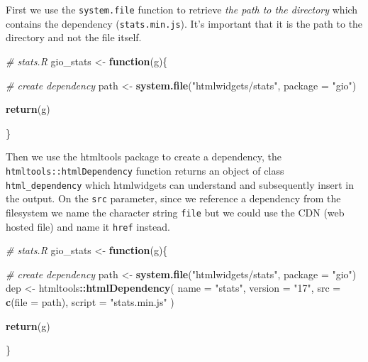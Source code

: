 \documentclass[
]{krantz}
\makeatletter
\newenvironment{Shaded}{\begin{snugshade}}{\end{snugshade}}
\newcommand{\CommentTok}[1]{\textcolor[rgb]{0.37,0.37,0.37}{\textit{#1}}}
\newcommand{\ControlFlowTok}[1]{\textcolor[rgb]{0.27,0.27,0.27}{\textbf{#1}}}
\newcommand{\DataTypeTok}[1]{\textcolor[rgb]{0.27,0.27,0.27}{#1}}
\newcommand{\KeywordTok}[1]{\textcolor[rgb]{0.27,0.27,0.27}{\textbf{#1}}}
\newcommand{\NormalTok}[1]{#1}
\newcommand{\OperatorTok}[1]{\textcolor[rgb]{0.43,0.43,0.43}{\textbf{#1}}}
\newcommand{\StringTok}[1]{\textcolor[rgb]{0.5,0.5,0.5}{#1}}
\newenvironment{kframe}{%
\medskip{}
\setlength{\fboxsep}{.8em}
 \def\at@end@of@kframe{}%
 \ifinner\ifhmode%
  \def\at@end@of@kframe{\end{minipage}}%
  \begin{minipage}{\columnwidth}%
 \fi\fi%
 \def\FrameCommand##1{\hskip\@totalleftmargin \hskip-\fboxsep
 \colorbox{shadecolor}{##1}\hskip-\fboxsep
     \hskip-\linewidth \hskip-\@totalleftmargin \hskip\columnwidth}%
 \MakeFramed {\advance\hsize-\width
   \@totalleftmargin\z@ \linewidth\hsize
   \@setminipage}}%
 {\par\unskip\endMakeFramed%
 \at@end@of@kframe}
\renewenvironment{Shaded}{\begin{kframe}}{\end{kframe}}
\makeatother
\begin{document}
First we use the \texttt{system.file} function to retrieve \emph{the path to the directory} which contains the dependency (\texttt{stats.min.js}). It's important that it is the path to the directory and not the file itself.

\begin{Shaded}
\begin{Highlighting}[]
\CommentTok{\# stats.R}
\NormalTok{gio\_stats <{-}}\StringTok{ }\ControlFlowTok{function}\NormalTok{(g)\{}

  \CommentTok{\# create dependency}
\NormalTok{  path <{-}}\StringTok{ }\KeywordTok{system.file}\NormalTok{(}\StringTok{"htmlwidgets/stats"}\NormalTok{, }\DataTypeTok{package =} \StringTok{"gio"}\NormalTok{)}

  \KeywordTok{return}\NormalTok{(g)}

\NormalTok{\}}
\end{Highlighting}
\end{Shaded}

Then we use the htmltools package to create a dependency, the \texttt{htmltools::htmlDependency} function returns an object of class \texttt{html\_dependency} which htmlwidgets can understand and subsequently insert in the output. On the \texttt{src} parameter, since we reference a dependency from the filesystem we name the character string \texttt{file} but we could use the CDN (web hosted file) and name it \texttt{href} instead.

\begin{Shaded}
\begin{Highlighting}[]
\CommentTok{\# stats.R}
\NormalTok{gio\_stats <{-}}\StringTok{ }\ControlFlowTok{function}\NormalTok{(g)\{}

  \CommentTok{\# create dependency}
\NormalTok{  path <{-}}\StringTok{ }\KeywordTok{system.file}\NormalTok{(}\StringTok{"htmlwidgets/stats"}\NormalTok{, }\DataTypeTok{package =} \StringTok{"gio"}\NormalTok{)}
\NormalTok{  dep <{-}}\StringTok{ }\NormalTok{htmltools}\OperatorTok{::}\KeywordTok{htmlDependency}\NormalTok{(}
    \DataTypeTok{name =} \StringTok{"stats"}\NormalTok{,}
    \DataTypeTok{version =} \StringTok{"17"}\NormalTok{,}
    \DataTypeTok{src =} \KeywordTok{c}\NormalTok{(}\DataTypeTok{file =}\NormalTok{ path),}
    \DataTypeTok{script =} \StringTok{"stats.min.js"}
\NormalTok{  )}

  \KeywordTok{return}\NormalTok{(g)}

\NormalTok{\}}
\end{Highlighting}
\end{Shaded}
\end{document}
